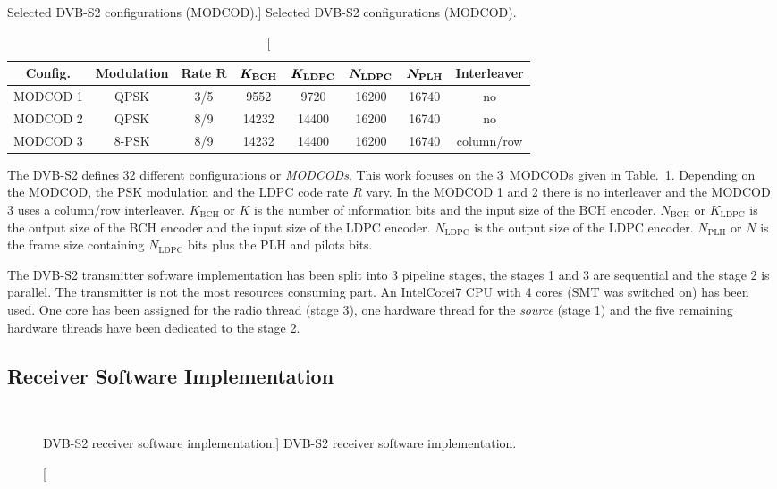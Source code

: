 \begin{table}[htp]
  \centering
  \caption
    [Selected DVB-S2 configurations (MODCOD).]
    {Selected DVB-S2 configurations (MODCOD).}
  \label{tab:dvbs2_modcod}
  \begin{tabular}{c c c c c c c c}
    \textbf{Config.} & \textbf{Modulation} & \textbf{Rate} $\bm{R}$ & $\bm{K_\text{\textbf{BCH}}}$ & $\bm{K_\text{\textbf{LDPC}}}$ & $\bm{N_\text{\textbf{LDPC}}}$ & $\bm{N_\text{\textbf{PLH}}}$ & \textbf{Interleaver}\\
    \hline \hline
    MODCOD 1 &  QPSK & 3/5 &  9552 &  9720 & 16200 & 16740 & no\\
    MODCOD 2 &  QPSK & 8/9 & 14232 & 14400 & 16200 & 16740 & no\\
    MODCOD 3 & 8-PSK & 8/9 & 14232 & 14400 & 16200 & 16740 & column/row\\
  \end{tabular}
\end{table}

The DVB-S2 defines 32 different configurations or \emph{MODCODs}. This work
focuses on the 3~MODCODs given in Table.~\ref{tab:dvbs2_modcod}. Depending on
the MODCOD, the PSK modulation and the LDPC code rate $R$ vary. In the MODCOD 1
and 2 there is no interleaver and the MODCOD 3 uses a column/row interleaver.
$K_\text{BCH}$ or $K$ is the number of information bits and the input size of
the BCH encoder. $N_\text{BCH}$ or $K_\text{LDPC}$ is the output size of the
BCH encoder and the input size of the LDPC encoder. $N_\text{LDPC}$ is the
output size of the LDPC encoder. $N_\text{PLH}$ or $N$ is the frame size
containing $N_\text{LDPC}$ bits plus the PLH and pilots bits.

The DVB-S2 transmitter software implementation has been split into 3 pipeline
stages, the stages 1 and 3 are sequential and the stage 2 is parallel. The
transmitter is not the most resources consuming part. An Intel\R Core\TM i7 CPU
with 4 cores (SMT was switched on) has been used. One core has been assigned for
the radio thread (stage 3), one hardware thread for the \emph{source} (stage 1)
and the five remaining hardware threads have been dedicated to the stage 2.

\subsection{Receiver Software Implementation}

\begin{figure}[htp]
  \centering
  \\
  \caption
    [DVB-S2 receiver software implementation.]
    {DVB-S2 receiver software implementation.}
  \label{fig:dvbs2_receiver}
\end{figure}

